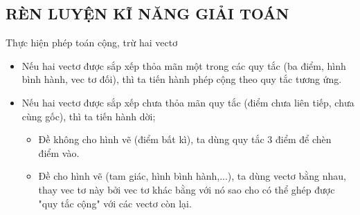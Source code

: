 \subsection{RÈN LUYỆN KĨ NĂNG GIẢI TOÁN}
\begin{dang}{Thực hiện phép toán cộng, trừ hai vectơ}
	\begin{itemize}
		\item [\iconMT] Nếu hai vectơ được sắp xếp thỏa mãn một trong các quy tắc (ba điểm, hình bình hành, vec tơ đối), thì ta tiến hành phép cộng theo quy tắc tương ứng.
		\item [\iconMT] Nếu hai vectơ được sắp xếp chưa thỏa mãn quy tắc (điểm chưa liên tiếp, chưa cùng gốc), thì ta tiến hành dời;
		\begin{itemize}
			\item Đề không cho hình vẽ (điểm bất kì), ta dùng quy tắc 3 điểm để chèn điểm vào.
			\item Đề cho hình vẽ (tam giác, hình bình hành,...), ta dùng vectơ bằng nhau, thay vec tơ này bởi vec tơ khác bằng với nó sao cho có thể ghép được "quy tắc cộng" với các vectơ còn lại.
		\end{itemize}
	\end{itemize}
\end{dang}
